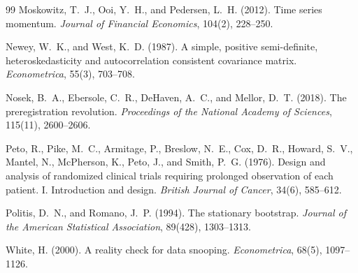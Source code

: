 \documentclass[11pt,a4paper]{article}
\newcommand{\1}{\mathbf{1}}
\begin{document}
\begin{thebibliography}{99}
 Moskowitz, T.~J., Ooi, Y.~H., and Pedersen, L.~H. (2012). Time series momentum. \emph{Journal of Financial Economics}, 104(2), 228--250.

 Newey, W.~K., and West, K.~D. (1987). A simple, positive semi-definite, heteroskedasticity and autocorrelation consistent covariance matrix. \emph{Econometrica}, 55(3), 703--708.

 Nosek, B.~A., Ebersole, C.~R., DeHaven, A.~C., and Mellor, D.~T. (2018). The preregistration revolution. \emph{Proceedings of the National Academy of Sciences}, 115(11), 2600--2606.

 Peto, R., Pike, M.~C., Armitage, P., Breslow, N.~E., Cox, D.~R., Howard, S.~V., Mantel, N., McPherson, K., Peto, J., and Smith, P.~G. (1976). Design and analysis of randomized clinical trials requiring prolonged observation of each patient. I. Introduction and design. \emph{British Journal of Cancer}, 34(6), 585--612.

 Politis, D.~N., and Romano, J.~P. (1994). The stationary bootstrap. \emph{Journal of the American Statistical Association}, 89(428), 1303--1313.

 White, H. (2000). A reality check for data snooping. \emph{Econometrica}, 68(5), 1097--1126.

\end{thebibliography}
\end{document}
